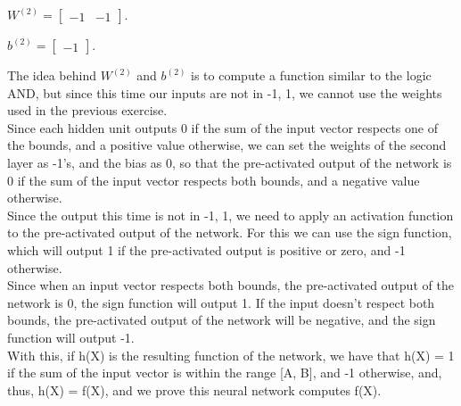 \documentclass{article}
\begin{document}
\( W^{(2)} = \begin{bmatrix}
    -1 & -1
\end{bmatrix}
\).

\(b^{(2)} = \begin{bmatrix}
    -1
\end{bmatrix}
\).

The idea behind \(W^{(2)}\) and \(b^{(2)}\) is to compute a function similar to the logic AND, but since this time our inputs are not in 
{-1, 1}, we cannot use the weights used in the previous exercise.\\
Since each hidden unit outputs 0 if the sum of the input vector respects one of the bounds, and a positive value otherwise, we can set the 
weights of the second layer as -1's, and the bias as 0, so that the pre-activated output of the network is 0 if the sum of the input vector 
respects both bounds, and a negative value otherwise.\\
Since the output this time is not in {-1, 1}, we need to apply an activation function to the pre-activated output of the network. For this we can use
the sign function, which will output 1 if the pre-activated output is positive or zero, and -1 otherwise.\\
Since when an input vector respects both bounds, the pre-activated output of the network is 0, the sign function will output 1. If the input doesn't
respect both bounds, the pre-activated output of the network will be negative, and the sign function will output -1.\\

With this, if h(X) is the resulting function of the network, we have that h(X) = 1 if the sum of the input vector is within the range [A, B], 
and -1 otherwise, and, thus, h(X) = f(X), and we prove this neural network computes f(X).\\
\end{document}
